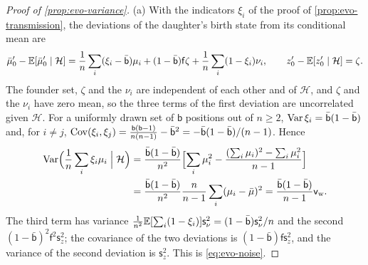 \begin{proof}[Proof of \cref{prop:evo-variance}]
(a) With the indicators $\xi_i$ of the proof of \cref{prop:evo-transmission}, the deviations of the daughter's birth state from its conditional mean are
\begin{equation*}
\bar\mu'_0-\mathbb{E}[\bar\mu'_0\mid\mathcal H]=\frac1n\sum_i(\xi_i-\bar{\mathsf b})\mu_i+(1-\bar{\mathsf b})\mathsf f\zeta+\frac1n\sum_i(1-\xi_i)\nu_i,\qquad z'_0-\mathbb{E}[z'_0\mid\mathcal H]=\zeta.
\end{equation*}
The founder set, $\zeta$ and the $\nu_i$ are independent of each other and of $\mathcal H$, and $\zeta$ and the $\nu_i$ have zero mean, so the three terms of the first deviation are uncorrelated given $\mathcal H$. For a uniformly drawn set of $\mathsf b$ positions out of $n\ge2$, $\operatorname{Var}\xi_i=\bar{\mathsf b}(1-\bar{\mathsf b})$ and, for $i\ne j$, $\operatorname{Cov}(\xi_i,\xi_j)=\frac{\mathsf b(\mathsf b-1)}{n(n-1)}-\bar{\mathsf b}^2=-\bar{\mathsf b}(1-\bar{\mathsf b})/(n-1)$. Hence
\begin{align*}
\operatorname{Var}\Bigl(\frac1n\sum_i\xi_i\mu_i\Bigm|\mathcal H\Bigr)&=\frac{\bar{\mathsf b}(1-\bar{\mathsf b})}{n^2}\Bigl[\sum_i\mu_i^2-\frac{(\sum_i\mu_i)^2-\sum_i\mu_i^2}{n-1}\Bigr]\\
&=\frac{\bar{\mathsf b}(1-\bar{\mathsf b})}{n^2}\frac{n}{n-1}\sum_i(\mu_i-\bar\mu)^2=\frac{\bar{\mathsf b}(1-\bar{\mathsf b})}{n-1}\mathsf v_{\mathrm w}.
\end{align*}
The third term has variance $\frac1{n^2}\mathbb{E}[\sum_i(1-\xi_i)]\mathsf s_\nu^2=(1-\bar{\mathsf b})\mathsf s_\nu^2/n$ and the second $(1-\bar{\mathsf b})^2\mathsf f^2\mathsf s_z^2$; the covariance of the two deviations is $(1-\bar{\mathsf b})\mathsf f\mathsf s_z^2$, and the variance of the second deviation is $\mathsf s_z^2$. This is \eqref{eq:evo-noise}.


\end{proof}
